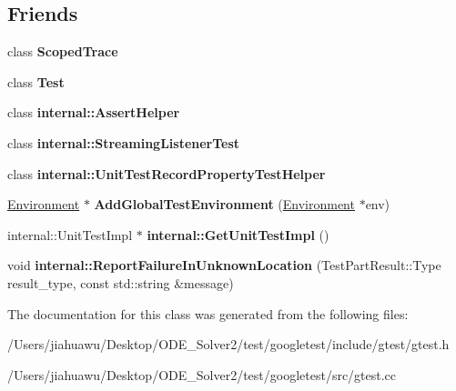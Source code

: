 \subsection*{Friends}
\begin{DoxyCompactItemize}
\item 
\mbox{\label{classtesting_1_1_unit_test_ada54bdd5bdc24f39b9ca16807326654a}} 
class {\bfseries Scoped\+Trace}
\item 
\mbox{\label{classtesting_1_1_unit_test_a5b78b1c2e1fa07ffed92da365593eaa4}} 
class {\bfseries Test}
\item 
\mbox{\label{classtesting_1_1_unit_test_a183151aa061362c87572e743fe233db1}} 
class {\bfseries internal\+::\+Assert\+Helper}
\item 
\mbox{\label{classtesting_1_1_unit_test_adc037d188dab349a94868991955c9cd4}} 
class {\bfseries internal\+::\+Streaming\+Listener\+Test}
\item 
\mbox{\label{classtesting_1_1_unit_test_ae970f89a9f477a349fe5778be85ef42e}} 
class {\bfseries internal\+::\+Unit\+Test\+Record\+Property\+Test\+Helper}
\item 
\mbox{\label{classtesting_1_1_unit_test_a5ec26e4c31220ff8e769cc09689a4d6d}} 
\mbox{\hyperlink{classtesting_1_1_environment}{Environment}} $\ast$ {\bfseries Add\+Global\+Test\+Environment} (\mbox{\hyperlink{classtesting_1_1_environment}{Environment}} $\ast$env)
\item 
\mbox{\label{classtesting_1_1_unit_test_a56e56be7066957d612e53b5c60f6ac08}} 
internal\+::\+Unit\+Test\+Impl $\ast$ {\bfseries internal\+::\+Get\+Unit\+Test\+Impl} ()
\item 
\mbox{\label{classtesting_1_1_unit_test_a73f5a158c13793b90c80d854c9a75120}} 
void {\bfseries internal\+::\+Report\+Failure\+In\+Unknown\+Location} (Test\+Part\+Result\+::\+Type result\+\_\+type, const std\+::string \&message)
\end{DoxyCompactItemize}


The documentation for this class was generated from the following files\+:\begin{DoxyCompactItemize}
\item 
/\+Users/jiahuawu/\+Desktop/\+O\+D\+E\+\_\+\+Solver2/test/googletest/include/gtest/gtest.\+h\item 
/\+Users/jiahuawu/\+Desktop/\+O\+D\+E\+\_\+\+Solver2/test/googletest/src/gtest.\+cc\end{DoxyCompactItemize}
